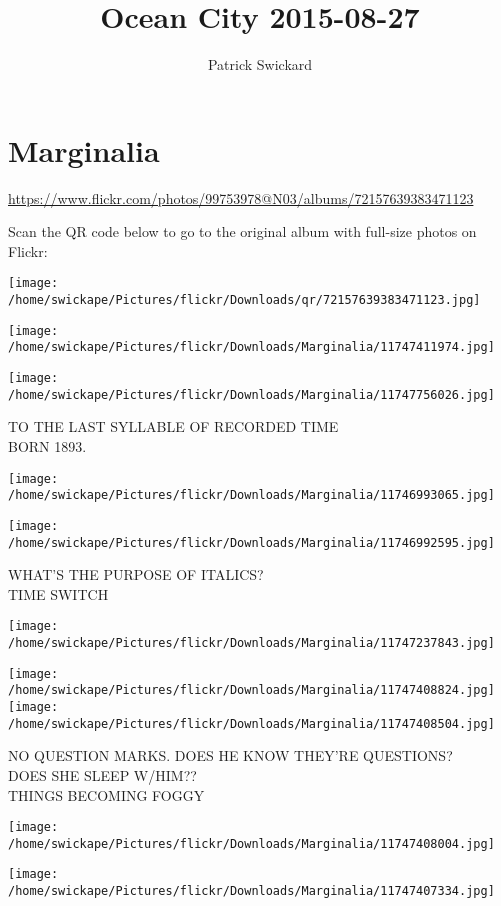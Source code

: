 \documentclass[10pt,letterpaper]{article}
\title{Ocean City 2015-08-27}
\author{Patrick Swickard}
\date{}
\begin{document}
\section*{Marginalia}

\url{https://www.flickr.com/photos/99753978@N03/albums/72157639383471123}

Scan the QR code below to go to the original album with full-size photos on Flickr:

\texttt{[image: /home/swickape/Pictures/flickr/Downloads/qr/72157639383471123.jpg]}
\pagebreak

\texttt{[image: /home/swickape/Pictures/flickr/Downloads/Marginalia/11747411974.jpg]}

\vspace{0.25in}
\texttt{[image: /home/swickape/Pictures/flickr/Downloads/Marginalia/11747756026.jpg]}

TO THE LAST SYLLABLE OF RECORDED TIME\\
BORN 1893.
\pagebreak

\texttt{[image: /home/swickape/Pictures/flickr/Downloads/Marginalia/11746993065.jpg]}

\vspace{0.25in}
\texttt{[image: /home/swickape/Pictures/flickr/Downloads/Marginalia/11746992595.jpg]}

WHAT'S THE PURPOSE OF ITALICS?\\
TIME SWITCH
\pagebreak

\texttt{[image: /home/swickape/Pictures/flickr/Downloads/Marginalia/11747237843.jpg]}

\vspace{0.25in}
\texttt{[image: /home/swickape/Pictures/flickr/Downloads/Marginalia/11747408824.jpg]}
\texttt{[image: /home/swickape/Pictures/flickr/Downloads/Marginalia/11747408504.jpg]}

NO QUESTION MARKS.  DOES HE KNOW THEY'RE QUESTIONS?\\
DOES SHE SLEEP W/HIM??\\
THINGS BECOMING FOGGY
\pagebreak

\texttt{[image: /home/swickape/Pictures/flickr/Downloads/Marginalia/11747408004.jpg]}

\vspace{0.25in}
\texttt{[image: /home/swickape/Pictures/flickr/Downloads/Marginalia/11747407334.jpg]}
\end{document}
